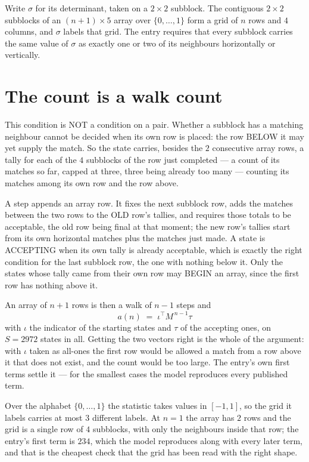 \documentclass[11pt,a4paper]{article}
\theoremstyle{plain}
\theoremstyle{definition}
\begin{document}
Write $\sigma$ for its determinant, taken on a $2\times2$ subblock. The contiguous $2\times2$
subblocks of an $(n+1)\times5$ array over $\{0,\dots,1\}$ form a grid of $n$ rows
and $4$ columns, and $\sigma$ labels that grid. The entry
requires that every subblock carries the same value of $\sigma$ as exactly one or two of its neighbours horizontally or vertically.

\section{The count is a walk count}

This condition is NOT a condition on a pair. Whether a subblock has a
matching neighbour cannot be decided when its own row is placed: the row BELOW it may yet
supply the match. So the state carries, besides the $2$ consecutive array rows, a tally for
each of the $4$ subblocks of the row just completed --- a count of its matches so far, capped at three, three being already too many --- counting its matches
among its own row and the row above.

A step appends an array row. It fixes the next subblock row, adds the matches between the two
rows to the OLD row's tallies, and requires those totals to be acceptable, the old row being
final at that moment; the new row's tallies start from its own horizontal matches plus the
matches just made. A state is ACCEPTING when its own tally is already acceptable, which is
exactly the right condition for the last subblock row, the one with nothing below it. Only the
states whose tally came from their own row may BEGIN an array, since the first row has nothing
above it.

An array of $n+1$ rows is then a walk of $n-1$ steps and
\[
a(n)\;=\;\iota^{\!\top}M^{\,n-1}\tau
\]
with $\iota$ the indicator of the starting states and $\tau$ of the accepting ones, on
$S=2972$ states in all. Getting the two vectors right is the whole of the argument: with
$\iota$ taken as all-ones the first row would be allowed a match from a row above it that does
not exist, and the count would be too large. The entry's own first terms settle it --- for
the smallest cases
the model reproduces every published term.

Over the alphabet $\{0,\dots,1\}$ the statistic takes values in $[-1,1]$, so the
grid it labels carries at most $3$ different labels. At $n=1$ the array has $2$
rows and the grid is a single row of $4$
subblocks, with only the neighbours inside that row; the entry's first term is
$234$, which the model reproduces along with every later term, and that is the cheapest
check that the grid has been read with the right shape.
\end{document}
